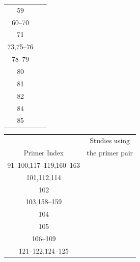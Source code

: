 \begin{center}
\begin{tabular}{ | c | c |}
        59 &~\cite{erv3_upregulated_diff_placental_cells,xpress_ERV3_induces_diff_BeWo} \\
        60--70 &~\cite{large_numb_polymorphic_nuc_term_env_ERV3} \\
        71 &~\cite{dna_methyl_modulates_HERV_E_CD4_T_cells_lupus} \\
        73,75--76 &~\cite{detect_xpress_hervE_env_transcript_prostate_adenocarci} \\
        78--79 &~\cite{detect_imm_hervE_env_select_xpress_kidney_cancer} \\
        80 &~\cite{xpress_HERVseq_PBMC,mon_activ_diff_aug_herv_xpress_implic_inflam_brain,transcript_act_herv_human} \\
        81 &~\cite{xpress_HERVseq_PBMC} \\
        82 &~\cite{xpress_select_herv_seqs_skin_PBMC_morphea} \\
        84 &~\cite{xpress_HERVseq_PBMC,mon_activ_diff_aug_herv_xpress_implic_inflam_brain,activ_TE_immune_cells_fibromyalgia,transcript_act_herv_human} \\
        85 &~\cite{struct_quant_xpress_herv_fam_human_tissue,survey_human_gen_retro_orig_id_transcriptome_env} \\
        \hline
    \end{tabular}
    \quad
    \begin{tabular}{ | c | c |}
        & Studies using \\
        Primer Index &  the primer pair \\
        \hline
        91--100,117--119,160--163 &~\cite{microarray_based_sketches_HERV_transcriptome} \\
        101,112,114 &~\cite{novel_RT_PCR_diff_detect_MSRenv_syncytin_MSE} \\
        102 &~\cite{mon_activ_diff_aug_herv_xpress_implic_inflam_brain,activ_TE_immune_cells_fibromyalgia,transcript_act_herv_human} \\
        103,158--159 &~\cite{transactiv_elem_HERV_W_fam_viral_infect} \\
        104 &~\cite{transactiv_elem_HERV_W_fam_viral_infect,xpress_HERVK_W_babies,hervK_W_transcript_activ_myalgic_encephal_fatigue} \\
        105 &~\cite{analysis_transcribed_HERV_W_env_clarifies_ms_RVs} \\
        106--109 &~\cite{direct_involv_HERV_W_env_glicoprot_human_trophobast} \\
        121--122,124--125 &~\cite{impaired_cell_fusion_diff_placentae_correlate_with_HERV_env,reactiv_codogenic_ERV_env_endometrial_carcinoma_prestages} \\

\end{tabular}
\end{center}
